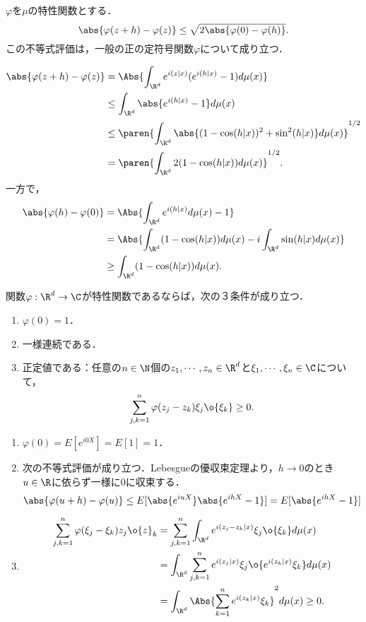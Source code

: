 \documentclass[uplatex,dvipdfmx]{jsreport}
\begin{document}
\begin{lemma}
    $\varphi$を$\mu$の特性関数とする．
    \[\abs{\varphi(z+h)-\varphi(z)}\le\sqrt{2\abs{\varphi(0)-\varphi(h)}}.\]
    この不等式評価は，一般の正の定符号関数$\varphi$について成り立つ．
\end{lemma}
\begin{Proof}
    \begin{align*}
        \abs{\varphi(z+h)-\varphi(z)}&=\Abs{\int_{\R^d}e^{i(z|x)}(e^{i(h|x)}-1)d\mu(x)}\\
        &\le\int_{\R^d}\abs{e^{i(h|x)}-1}d\mu(x)\\
        &\le\paren{\int_{\R^d}\abs{(1-\cos(h|x))^2+\sin^2(h|x)}d\mu(x)}^{1/2}\\
        &=\paren{\int_{\R^d}2(1-\cos(h|x))d\mu(x)}^{1/2}.
    \end{align*}
    一方で，
    \begin{align*}
        \abs{\varphi(h)-\varphi(0)}&=\Abs{\int_{\R^d}e^{i(h|x)}d\mu(x)-1}\\
        &=\Abs{\int_{\R^d}(1-\cos(h|x))d\mu(x)-i\int_{\R^d}\sin(h|x)d\mu(x)}\\
        &\ge\int_{\R^d}(1-\cos(h|x))d\mu(x).
    \end{align*}
\end{Proof}

\begin{proposition}
    関数$\varphi:\R^d\to\C$が特性関数であるならば，次の３条件が成り立つ．
    \begin{enumerate}
        \item $\varphi(0)=1$．
        \item 一様連続である．
        \item 正定値である：任意の$n\in\N$個の$z_1,\cdots,z_n\in\R^d$と$\xi_1,\cdots,\xi_n\in\C$について，
        \[\sum^n_{j,k=1}\varphi(z_j-z_k)\xi_j\o{\xi_k}\ge0.\]
    \end{enumerate}
\end{proposition}
\begin{Proof}\mbox{}
    \begin{enumerate}
        \item $\varphi(0)=E[e^{i0X}]=E[1]=1$．
        \item 次の不等式評価が成り立つ．Lebesgueの優収束定理より，$h\to0$のとき$u\in\R$に依らず一様に$0$に収束する．
        \[\abs{\varphi(u+h)-\varphi(u)}\le E[\abs{e^{iuX}}\abs{e^{ihX}-1}]=E[\abs{e^{ihX}-1}]\]
        \item \begin{align*}
            \sum^n_{j,k=1}\varphi(\xi_j-\xi_k)z_j\o{z}_k&=\sum_{j,k=1}^n\int_{\R^d}e^{i(z_j-z_k|x)}\xi_j\o{\xi_k}d\mu(x)\\
            &=\int_{\R^d}\sum_{j,k=1}^ne^{i(z_j|x)}\xi_j\o{e^{i(z_k|x)}\xi_k}d\mu(x)\\
            &=\int_{\R^d}\Abs{\sum_{k=1}^ne^{i(z_k|x)}\xi_k}^2d\mu(x)\ge0.
        \end{align*}
    \end{enumerate}
\end{Proof}
\end{document}
